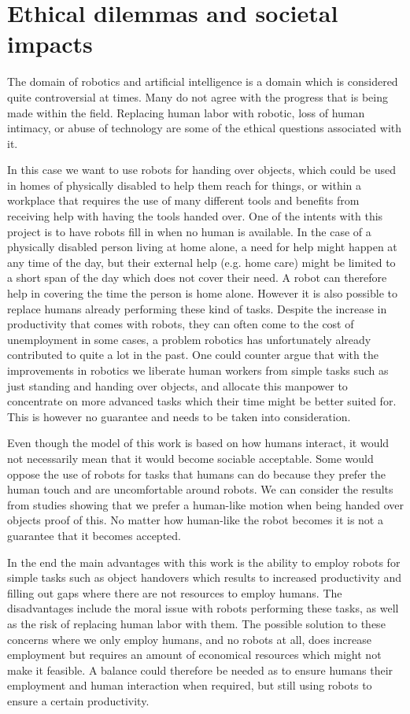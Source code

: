 
\section{Ethical dilemmas and societal impacts}

The domain of robotics and artificial intelligence is a domain which is considered quite controversial at times. Many do not agree with the progress that is being made within the field. Replacing human labor with robotic, loss of human intimacy, or abuse of technology are some of the ethical questions associated with it.

In this case we want to use robots for handing over objects, which could be used in homes of physically disabled to help them reach for things, or within a workplace that requires the use of many different tools and benefits from receiving help with having the tools handed over. One of the intents with this project is to have robots fill in when no human is available. In the case of a physically disabled person living at home alone, a need for help might happen at any time of the day, but their external help (e.g. home care) might be limited to a short span of the day which does not cover their need. A robot can therefore help in covering the time the person is home alone. However it is also possible to replace humans already performing these kind of tasks. Despite the increase in productivity that comes with robots, they can often come to the cost of unemployment in some cases, a problem robotics has unfortunately already contributed to quite a lot in the past. One could counter argue that with the improvements in robotics we liberate human workers from simple tasks such as just standing and handing over objects, and allocate this manpower to concentrate on more advanced tasks which their time might be better suited for. This is however no guarantee and needs to be taken into consideration.

Even though the model of this work is based on how humans interact, it would not necessarily mean that it would become sociable acceptable. Some would oppose the use of robots for tasks that humans can do because they prefer the human touch and are uncomfortable around robots. We can consider the results from studies showing that we prefer a human-like motion when being handed over objects proof of this. No matter how human-like the robot becomes it is not a guarantee that it becomes accepted.

In the end the main advantages with this work is the ability to employ robots for simple tasks such as object handovers which results to increased productivity and filling out gaps where there are not resources to employ humans. The disadvantages include the moral issue with robots performing these tasks, as well as the risk of replacing human labor with them. The possible solution to these concerns where we only employ humans, and no robots at all, does increase employment but requires an amount of economical resources which might not make it feasible. A balance could therefore be needed as to ensure humans their employment and human interaction when required, but still using robots to ensure a certain productivity.



